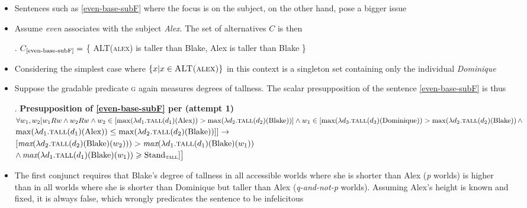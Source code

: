 \documentclass[11pt,letterpaper]{scrartcl}
\begin{document}
\begin{itemize}
    \item Sentences such as \ref{even-base-subF} where the focus is on the subject, on the other hand, pose a bigger issue
    
    \item Assume \textit{even} associates with the subject \textit{Alex}. The set of alternatives $C$ is then

    \ex. $C_{\text{\ref{even-base-subF}}} =$ \{ \textsc{ALT(alex)} is taller than Blake, Alex is taller than Blake \}
    
    \item Considering the simplest case where $\{x | x \in \textsc{ALT(alex)}\}$ in this context is a singleton set containing only the individual \textit{Dominique}
    
    \item Suppose the gradable predicate \textsc{g} again measures degrees of tallness. The scalar presupposition of the sentence \ref{even-base-subF} is thus
    
    \ex. \textbf{Presupposition of \ref{even-base-subF} per \cite{greenberg_revised_2018} (attempt 1)} \\ 
    $\forall w_1, w_2 [w_1Rw \land w_2Rw \land w_2 \in [\max(\lambda d_1.\textsc{tall}(d_1)(\text{Alex})) > \max(\lambda d_2.\textsc{tall}(d_2)(\text{Blake}))]  
    \land 
    w_1 \in [\max(\lambda d_3.\textsc{tall}(d_3)(\text{Dominique})) >  \max(\lambda d_2.\textsc{tall}(d_2)(\text{Blake})) \, \land$ \\  \hspace*{\fill} $\max(\lambda d_1.\textsc{tall}(d_1)(\text{Alex})) \leq \max(\lambda d_2.\textsc{tall}(d_2)(\text{Blake}))]] \rightarrow
    $ \\
    $[\textit{max}(\lambda d_2.\textsc{tall}(d_2)(\text{Blake})(w_2))) > \textit{max}(\lambda d_1.\textsc{tall}(d_1)(\text{Blake})(w_1))$ \\ 
    $\land \, \textit{max}(\lambda d_1.\textsc{tall}(d_1)(\text{Blake})(w_1)) \geqslant \text{Stand}_{\textsc{tall}} ] \big]$
    
    \item The first conjunct requires that Blake's degree of tallness in all accessible worlds where she is shorter than Alex (\textit{p} worlds) is higher than in all worlds where she is shorter than Dominique but taller than Alex (\textit{q-and-not-p} worlds). Assuming Alex's height is known and fixed, it is always false, which wrongly predicates the sentence to be infelicitous
    

\end{itemize}
\end{document}
